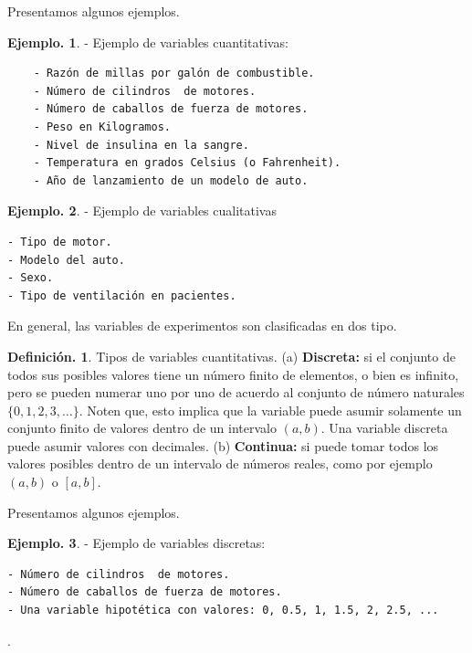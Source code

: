 \documentclass[]{book}
\theoremstyle{definition}
\newtheorem{definition}{Definición.}[chapter]
\theoremstyle{definition}
\newtheorem{example}{Ejemplo.}[chapter]
\theoremstyle{definition}
\theoremstyle{remark}
\begin{document}
Presentamos algunos ejemplos.

\begin{example}
\protect\hypertarget{exm:unnamed-chunk-23}{}{\label{exm:unnamed-chunk-23} }- Ejemplo de variables cuantitativas:

\begin{verbatim}
    - Razón de millas por galón de combustible. 
    - Número de cilindros  de motores.
    - Número de caballos de fuerza de motores.
    - Peso en Kilogramos.
    - Nivel de insulina en la sangre.
    - Temperatura en grados Celsius (o Fahrenheit).
    - Año de lanzamiento de un modelo de auto.
\end{verbatim}
\end{example}

\begin{example}
\protect\hypertarget{exm:unnamed-chunk-24}{}{\label{exm:unnamed-chunk-24} }- Ejemplo de variables cualitativas

\begin{verbatim}
- Tipo de motor.
- Modelo del auto.
- Sexo.
- Tipo de ventilación en pacientes.  
\end{verbatim}
\end{example}

En general, las variables de experimentos son
clasificadas en dos tipo.

\begin{definition}
\protect\hypertarget{def:unnamed-chunk-25}{}{\label{def:unnamed-chunk-25} }
Tipos de variables cuantitativas. (a) \textbf{Discreta:} si
el conjunto de todos sus posibles valores
tiene un número finito de elementos, o bien es infinito,
pero se pueden numerar uno por uno de acuerdo al conjunto
de número naturales
\(\{0,1,2,3,\ldots\}\). Noten que, esto implica que la
variable puede asumir solamente un conjunto
finito de valores dentro de un intervalo \((a,b)\). Una
variable discreta puede asumir valores con
decimales. (b) \textbf{Continua:} si puede tomar todos los
valores posibles dentro de un intervalo de
números reales, como por ejemplo \((a,b)\) o \([a,b]\).
\end{definition}

Presentamos algunos ejemplos.

\begin{example}
\protect\hypertarget{exm:unnamed-chunk-26}{}{\label{exm:unnamed-chunk-26} }- Ejemplo de variables discretas:

\begin{verbatim}
- Número de cilindros  de motores.
- Número de caballos de fuerza de motores.
- Una variable hipotética con valores: 0, 0.5, 1, 1.5, 2, 2.5, ...
\end{verbatim}

.
\end{example}
\end{document}
